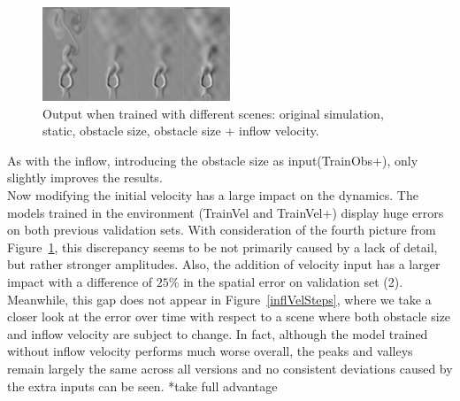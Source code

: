 \documentclass[sigconf]{acmart}
\begin{document}
\begin{figure}
	\includegraphics[width=0.5\textwidth]{imgs/addinputs_comparison.png}
	\caption{Output when trained with different scenes: original simulation, static, obstacle size, obstacle size  + inflow velocity.}
	\label{addinputs_img}
\end{figure}
As with the inflow, introducing the obstacle size as input(TrainObs+), only slightly improves the results.\\
Now modifying the initial velocity has a large impact on the dynamics. The models trained in the environment (TrainVel and TrainVel+) display huge errors on both previous validation sets. With consideration of the fourth picture from Figure~\ref{addinputs_img}, this discrepancy seems to be not primarily caused by a lack of detail, but rather stronger amplitudes. Also, the addition of velocity input has a larger impact with a difference of $25\%$ in the spatial error on validation set (2).
Meanwhile, this gap does not appear in Figure~\ref{inflVelSteps}, where we take a closer look at the error over time with respect to a scene where both obstacle size and inflow velocity are subject to change.
In fact, although the model trained without inflow velocity performs much worse overall, the peaks and valleys remain largely the same across all versions and no consistent deviations caused by the extra inputs can be seen.
*take full advantage
\end{document}

